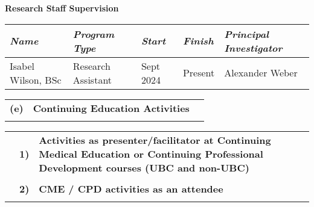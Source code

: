\documentclass[11pt,notitlepage,english]{report}
\begin{document}
\noindent \textbf{Research Staff Supervision}
\\

\begin{table}[H]
  \begin{adjustwidth}{-1cm}{-1cm}
    \small
  \centering
  \begin{tabular}{|L{4cm}|L{4cm}|L{2cm}|L{2cm}|L{3cm}|}
    \hline
    \textbf{\textit{Name}}                  & \textbf{\textit{Program Type}} & \textbf{\textit{Start}} & \textbf{\textit{Finish}} & \textbf{\textit{Principal Investigator}} \\
    \hline
    Isabel Wilson, BSc        & Research Assistant     & Sept 2024       & Present & Alexander Weber         \\
    \hline
  \end{tabular}
\end{adjustwidth}
\end{table}

\begin{tabular}{L{.5cm} L{8cm} L{6.9cm}}
  \\
  \textbf{(e)} & \textbf{Continuing Education Activities} \\
  \\
\end{tabular}


\begin{tabular}{L{.5cm} L{.5cm} L{15cm}}
  \\
   & \textbf{1)} & \textbf{Activities as presenter/facilitator at Continuing Medical Education or Continuing Professional Development courses (UBC and non-UBC)}\\
   \\
   & \textbf{2)} & \textbf{CME / CPD activities as an attendee}\\
   \\
\end{tabular}
\end{document}
